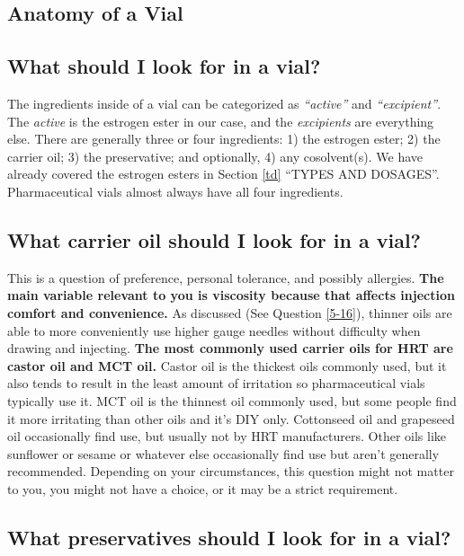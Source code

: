 \documentclass{article}
\begin{document}
\subsection*{Anatomy of a Vial}

\subsection{What should I look for in a vial?}

The ingredients inside of a vial can be categorized as \textit{“active”} and \textit{“excipient”}. The\textit{ active} is the estrogen ester in our case, and the \textit{excipients} are everything else. There are generally three or four ingredients: 1) the estrogen ester; 2) the carrier oil; 3) the preservative; and optionally, 4) any cosolvent(s). We have already covered the estrogen esters in Section \ref{td} “TYPES AND DOSAGES”. Pharmaceutical vials almost always have all four ingredients.

\subsection{What carrier oil should I look for in a vial?}\label{6-16}

This is a question of preference, personal tolerance, and possibly allergies. \textbf{The main variable relevant to you is viscosity because that affects injection comfort and convenience.} As discussed (See Question \ref{5-16}), thinner oils are able to more conveniently use higher gauge needles without difficulty when drawing and injecting. \textbf{The most commonly used carrier oils for HRT are castor oil and MCT oil. }Castor oil is the thickest oils commonly used, but it also tends to result in the least amount of irritation so pharmaceutical vials typically use it. MCT oil is the thinnest oil commonly used, but some people find it more irritating than other oils and it’s DIY only. Cottonseed oil and grapeseed oil occasionally find use, but usually not by HRT manufacturers. Other oils like sunflower or sesame or whatever else occasionally find use but aren’t generally recommended. Depending on your circumstances, this question might not matter to you, you might not have a choice, or it may be a strict requirement. 

\subsection{What preservatives should I look for in a vial?}\label{6-17}
\end{document}
